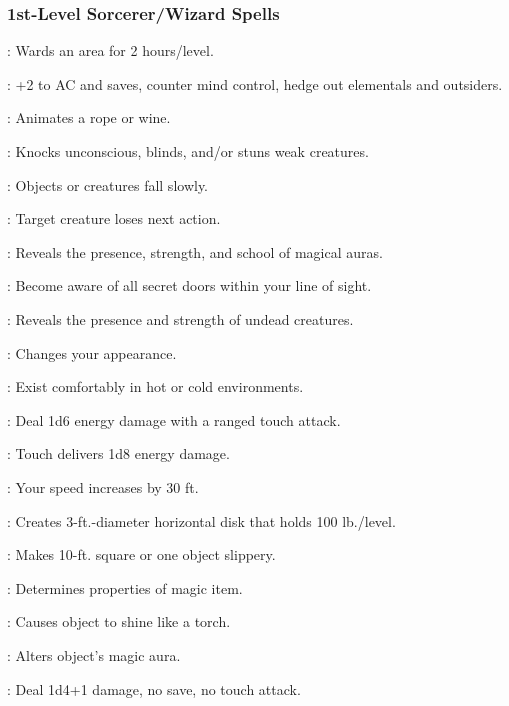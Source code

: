 \subsubsection{1st-Level Sorcerer/Wizard Spells}
\begin{list}{}{\leftmargin=1em}
\item {}: Wards an area for 2 hours/level.
\item {}: +2 to AC and saves, counter mind control, hedge out elementals and outsiders.
\item {}: Animates a rope or wine.
\item {}: Knocks unconscious, blinds, and/or stuns weak creatures.
\item {}: Objects or creatures fall slowly.
\item {}: Target creature loses next action.
\item {}: Reveals the presence, strength, and school of magical auras.
\item {}: Become aware of all secret doors within your line of sight.
\item {}: Reveals the presence and strength of undead creatures.
\item {}: Changes your appearance.
\item {}: Exist comfortably in hot or cold environments.
\item {}: Deal 1d6 energy damage with a ranged touch attack.
\item {}: Touch delivers 1d8 energy damage.
\item {}: Your speed increases by 30 ft.
\item {}: Creates 3-ft.-diameter horizontal disk that holds 100 lb./level.
\item {}: Makes 10-ft. square or one object slippery.
\item {}: Determines properties of magic item.
\item {}: Causes object to shine like a torch.
\item {}: Alters object's magic aura.
\item {}: Deal 1d4+1 damage, no save, no touch attack.

\end{list}
